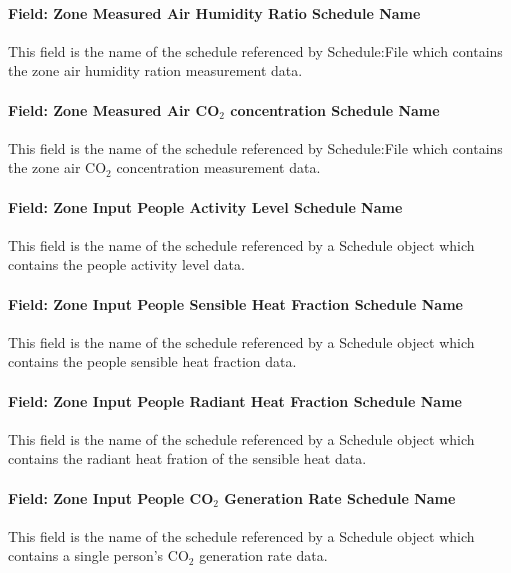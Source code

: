 \documentclass[11pt]{article}
\begin{document}
\paragraph{Field: Zone Measured Air Humidity Ratio Schedule Name}\label{field-zone-measured-air-humidity-ratio-schedule-name-hm}
This field is the name of the schedule referenced by Schedule:File which contains the zone air humidity ration measurement data.

\paragraph{Field: Zone Measured Air CO$_2$ concentration Schedule Name}\label{field-zone-measured-air-co2-concentration-schedule-name-hm}
This field is the name of the schedule referenced by Schedule:File which contains the zone air CO$_2$ concentration measurement data.

\paragraph{Field: Zone Input People Activity Level Schedule Name}\label{field-zone-input-people-activity-schedule-name-hm}
This field is the name of the schedule referenced by a Schedule object which contains the people activity level data.

\paragraph{Field: Zone Input People Sensible Heat Fraction Schedule Name}\label{field-zone-input-people-sensible-heat-fraction-schedule-name-hm}
This field is the name of the schedule referenced by a Schedule object which contains the people sensible heat fraction data.

\paragraph{Field: Zone Input People Radiant Heat Fraction Schedule Name}\label{field-zone-input-people-radiant-heat-fraction-schedule-name-hm}
This field is the name of the schedule referenced by a Schedule object which contains the radiant heat fration of the sensible heat data.

\paragraph{Field: Zone Input People CO$_2$ Generation Rate Schedule Name}\label{field-zone-input-people-co2-generation-rate-schedule-name-hm}
This field is the name of the schedule referenced by a Schedule object which contains a single person's CO$_2$ generation rate data.
\end{document}
